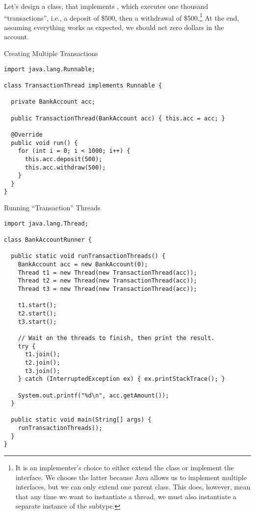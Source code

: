 Let's design a  class, that implements , which executes one thousand ``transactions'', i.e., a deposit of \$500, then a withdrawal of \$500.\footnote{It is an implementer's choice to either extend the  class or implement the  interface. We choose the latter because Java allows us to implement multiple interfaces, but we can only extend one parent class. This does, however, mean that any time we want to instantiate a thread, we must also instantiate a separate instance of the  subtype.} At the end, assuming everything works as expected, we should net zero dollars in the account.

\begin{cl}{Creating Multiple Transactions}
\begin{lstlisting}[language=MyJava]
import java.lang.Runnable;

class TransactionThread implements Runnable {

  private BankAccount acc;

  public TransactionThread(BankAccount acc) { this.acc = acc; }

  @Override
  public void run() {
    for (int i = 0; i < 1000; i++) {
      this.acc.deposit(500);
      this.acc.withdraw(500);
    }
  }
}
\end{lstlisting}
\end{cl}

\begin{cl}{Running ``Transaction'' Threads}
\begin{lstlisting}[language=MyJava]
import java.lang.Thread;

class BankAccountRunner {

  public static void runTransactionThreads() {
    BankAccount acc = new BankAccount(0);
    Thread t1 = new Thread(new TransactionThread(acc));
    Thread t2 = new Thread(new TransactionThread(acc));
    Thread t3 = new Thread(new TransactionThread(acc));

    t1.start();
    t2.start();
    t3.start();

    // Wait on the threads to finish, then print the result.
    try {
      t1.join();
      t2.join();
      t3.join();
    } catch (InterruptedException ex) { ex.printStackTrace(); }

    System.out.printf("%d\n", acc.getAmount());
  }

  public static void main(String[] args) {
    runTransactionThreads();
  }
}
\end{lstlisting}
\end{cl}

